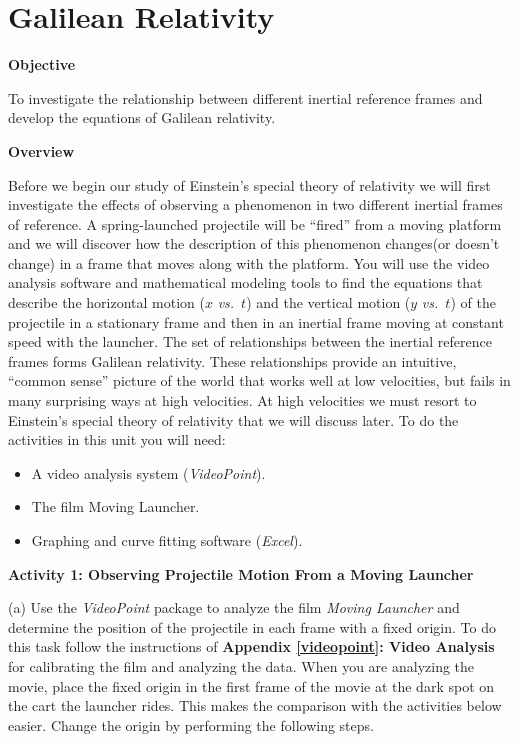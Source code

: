 
\section{Galilean Relativity}

\makelabheader %

\textbf{Objective }

To investigate the relationship between different inertial reference
frames and develop the equations of Galilean relativity.

\textbf{Overview}

Before we begin our study of Einstein's special theory of relativity
we will first investigate the effects of observing a phenomenon in
two different inertial frames of reference. A spring-launched projectile
will be {}``fired'' from a moving platform and we will discover
how the description of this phenomenon changes(or doesn't change)
in a frame that moves along with the platform. You will use the video
analysis software and mathematical modeling tools to find the equations
that describe the horizontal motion ($x$ \textit{vs.}~$t$) and the vertical motion
($y$ \textit{vs.}~$t$) of the projectile in a stationary frame and then in an inertial
frame moving at constant speed with the launcher. The set of relationships
between the inertial reference frames forms Galilean relativity. These
relationships provide an intuitive, {}``common sense'' picture of
the world that works well at low velocities, but fails in many surprising
ways at high velocities. At high velocities we must resort to Einstein's
special theory of relativity that we will discuss later. To do the
activities in this unit you will need:

\begin{itemize}
\item A video analysis system (\emph{VideoPoint}).
\item The film Moving Launcher.
\item Graphing and curve fitting software (\emph{Excel}).
\end{itemize}
\textbf{Activity 1: Observing Projectile Motion From a Moving Launcher}

(a) Use the \emph{VideoPoint} package to analyze the film \emph{Moving
Launcher} and determine the position of the projectile in each frame
with a fixed origin. To do this task follow the instructions of \textbf{Appendix
\ref{videopoint}: Video Analysis} for calibrating the film and analyzing the data.
When you are analyzing the movie, place the fixed origin in the first
frame of the movie at the dark spot on the cart the launcher rides.
This makes the comparison with the activities below easier. Change
the origin by performing the following steps.


